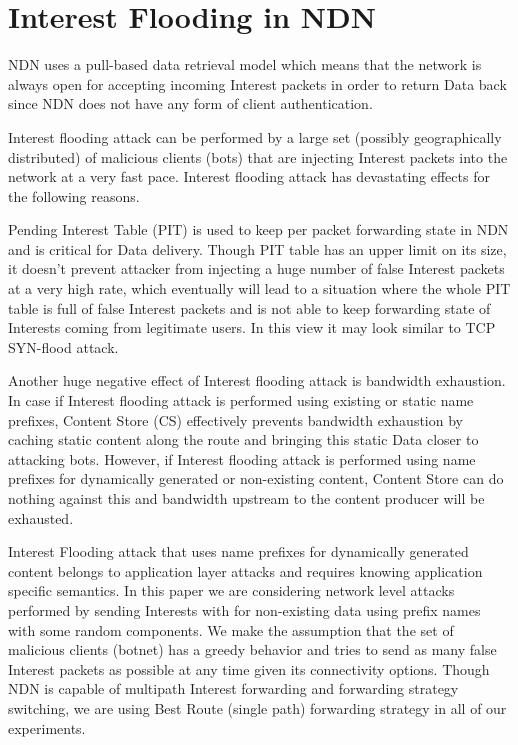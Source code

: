 \section{Interest Flooding in NDN}
\label{sec:interest flooding}


NDN uses a pull-based data retrieval model which means that the network is always open for accepting incoming Interest packets in order to return Data back since NDN does not have any form of client authentication.

Interest flooding attack can be performed by a large set (possibly geographically distributed) of malicious clients (bots) that are injecting Interest packets into the network at a very fast pace. Interest flooding attack has devastating effects for the following reasons. 

Pending Interest Table (PIT) is used to keep per packet forwarding state in NDN and is critical for Data delivery. Though PIT table has an upper limit on its size, it doesn't prevent attacker from injecting a huge number of false Interest packets at a very high rate, which eventually will lead to a situation where the whole PIT table is full of false Interest packets and is not able to keep forwarding state of Interests coming from legitimate users. In this view it may look similar to TCP SYN-flood attack.

Another huge negative effect of Interest flooding attack is bandwidth exhaustion. In case if Interest flooding attack is performed using existing or static name prefixes, Content Store (CS) effectively prevents bandwidth exhaustion by caching static content along the route and bringing this static Data closer to attacking bots. However, if Interest flooding attack is performed using name prefixes for dynamically generated or non-existing content, Content Store can do nothing against this and bandwidth upstream to the content producer will be exhausted.

Interest Flooding attack that uses name prefixes for dynamically generated content belongs to application layer attacks and requires knowing application specific semantics. In this paper we are considering network level attacks performed by sending Interests with for non-existing data using prefix names with some random components. We make the assumption that the set of malicious clients (botnet) has a greedy behavior and tries to send as many false Interest packets as possible at any time given its connectivity options. Though NDN is capable of multipath Interest forwarding and forwarding strategy switching, we are using Best Route (single path) forwarding strategy in all of our experiments. 

